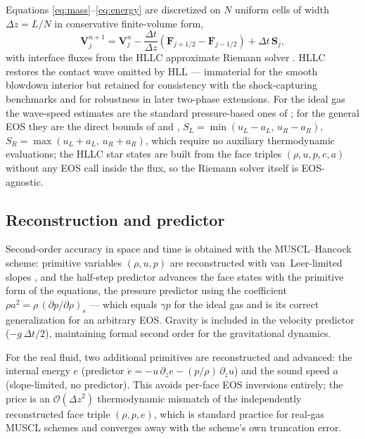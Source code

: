 \documentclass[11pt]{article}
\begin{document}
Equations \eqref{eq:mass}--\eqref{eq:energy} are discretized on $N$
uniform cells of width $\Delta z = L/N$ in conservative finite-volume
form,
\begin{equation}
\mathbf{V}_j^{n+1} = \mathbf{V}_j^{n}
 - \frac{\Delta t}{\Delta z}\left(\mathbf{F}_{j+1/2} -
 \mathbf{F}_{j-1/2}\right) + \Delta t\, \mathbf{S}_j,
\end{equation}
with interface fluxes from the HLLC approximate Riemann solver
\citep{toro1994,toro2009}. HLLC restores the contact wave omitted by
HLL --- immaterial for the smooth blowdown interior but retained for
consistency with the shock-capturing benchmarks and for robustness in
later two-phase extensions. For the ideal gas the wave-speed estimates
are the standard pressure-based ones of \citet{toro2009}; for the
general EOS they are the direct bounds of
\citet{davis1988} and \citet{einfeldt1988},
$S_L = \min(u_L - a_L,\, u_R - a_R)$,
$S_R = \max(u_L + a_L,\, u_R + a_R)$, which require no auxiliary
thermodynamic evaluations; the HLLC star states are built from the
face triples $(\rho, u, p, e, a)$ without any EOS call inside the
flux, so the Riemann solver itself is EOS-agnostic.

\subsection{Reconstruction and predictor}

Second-order accuracy in space and time is obtained with the
MUSCL--Hancock scheme: primitive variables $(\rho, u, p)$ are
reconstructed with van~Leer-limited slopes \citep{vanleer1984}, and
the half-step predictor advances the face states with the primitive
form of the equations, the pressure predictor using the coefficient
$\rho a^2 = \rho\,(\partial p/\partial\rho)_s$ --- which equals
$\gamma p$ for the ideal gas and is its correct generalization for an
arbitrary EOS. Gravity is included in the velocity predictor
($-g\,\Delta t/2$), maintaining formal second order for the
gravitational dynamics.

For the real fluid, two additional primitives are reconstructed and
advanced: the internal energy $e$ (predictor
$\dot e = -u\,\partial_z e - (p/\rho)\,\partial_z u$) and the sound
speed $a$ (slope-limited, no predictor). This avoids per-face EOS
inversions entirely; the price is an $\mathcal{O}(\Delta z^2)$
thermodynamic mismatch of the independently reconstructed face triple
$(\rho, p, e)$, which is standard practice for real-gas MUSCL schemes
and converges away with the scheme's own truncation error.
\end{document}

